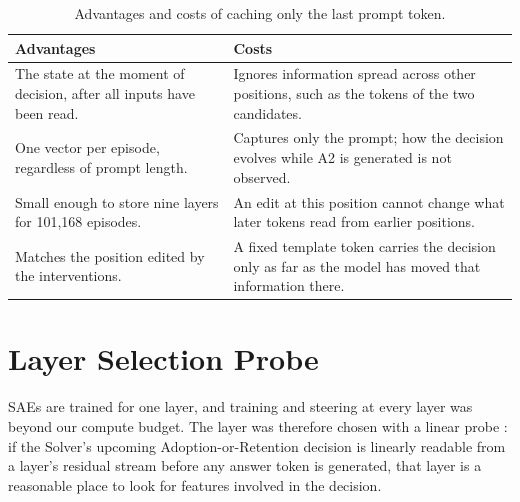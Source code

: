 \begin{table}[htbp]
    \centering
    \caption{Advantages and costs of caching only the last prompt token.}
    \label{tab:last-token}
    \small
    \begin{tabular}{p{7.2cm}p{7.2cm}}
        \toprule
        Advantages & Costs \tabularnewline
        \midrule
        \raggedright The state at the moment of decision, after all inputs
            have been read.
            & \raggedright Ignores information spread across other positions,
              such as the tokens of the two candidates. \tabularnewline
        \raggedright One vector per episode, regardless of prompt length.
            & \raggedright Captures only the prompt; how the decision evolves
              while A2 is generated is not observed. \tabularnewline
        \raggedright Small enough to store nine layers for 101,168 episodes.
            & \raggedright An edit at this position cannot change what later
              tokens read from earlier positions. \tabularnewline
        \raggedright Matches the position edited by the interventions.
            & \raggedright A fixed template token carries the decision only as
              far as the model has moved that information there.
              \tabularnewline
        \bottomrule
    \end{tabular}
\end{table}

\section{Layer Selection Probe}
\label{sec:layer-selection}

SAEs are trained for one layer, and training and steering at every layer was
beyond our compute budget. The layer was therefore chosen with a linear probe
\cite{alain2016probes}: if the Solver's upcoming Adoption-or-Retention
decision is linearly readable from a layer's residual stream before any answer
token is generated, that layer is a reasonable place to look for features
involved in the decision.

